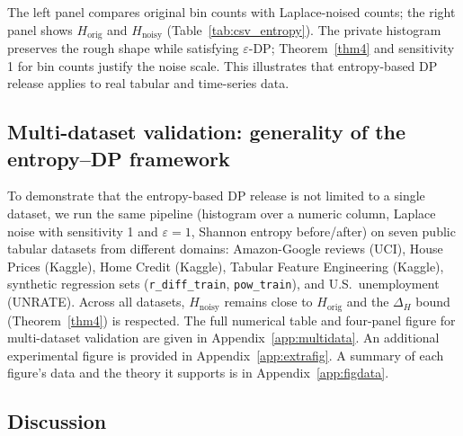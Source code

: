 \documentclass[journal,transmag]{IEEEtran}
\begin{document}
The left panel compares original bin counts with Laplace-noised counts; the right panel shows $H_{\mathrm{orig}}$ and $H_{\mathrm{noisy}}$ (Table~\ref{tab:csv_entropy}). The private histogram preserves the rough shape while satisfying $\varepsilon$-DP; Theorem~\ref{thm4} and sensitivity 1 for bin counts justify the noise scale. This illustrates that entropy-based DP release applies to real tabular and time-series data.


\subsection{Multi-dataset validation: generality of the entropy--DP framework}
To demonstrate that the entropy-based DP release is not limited to a single dataset, we run the same pipeline (histogram over a numeric column, Laplace noise with sensitivity 1 and $\varepsilon=1$, Shannon entropy before/after) on seven public tabular datasets from different domains: Amazon-Google reviews (UCI), House Prices (Kaggle), Home Credit (Kaggle), Tabular Feature Engineering (Kaggle), synthetic regression sets (\texttt{r\_diff\_train}, \texttt{pow\_train}), and U.S.\ unemployment (UNRATE). Across all datasets, $H_{\mathrm{noisy}}$ remains close to $H_{\mathrm{orig}}$ and the $\Delta_H$ bound (Theorem~\ref{thm4}) is respected. The full numerical table and four-panel figure for multi-dataset validation are given in Appendix~\ref{app:multidata}. An additional experimental figure is provided in Appendix~\ref{app:extrafig}. A summary of each figure's data and the theory it supports is in Appendix~\ref{app:figdata}.


\subsection{Discussion}
\end{document}
